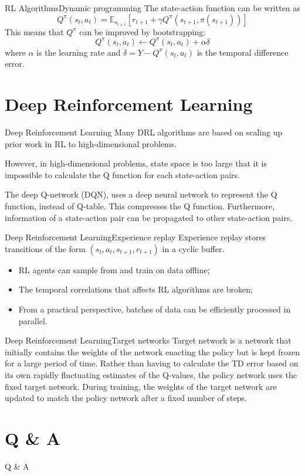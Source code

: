\documentclass{beamer}
\begin{document}
  \begin{frame}{RL Algorithms}{Dynamic programming}
  The state-action function can be written as
  $$ Q^{\pi}(s_t, a_t) = \mathbb{E}_{s_{t+1}}[r_{t+1}+\gamma Q^{\pi}(s_{t+1}, \pi(s_{t+1}))] $$
  This means that $Q^{\pi}$ can be improved by bootstrapping:
  $$ Q^{\pi}(s_t, a_t) \leftarrow Q^{\pi}(s_t, a_t)+ \alpha \delta $$
  where $\alpha$ is the learning rate and $\delta = Y - Q^{\pi}(s_t, a_t)$ is the temporal difference error. 
  \end{frame}

  \section{Deep Reinforcement Learning}
  \begin{frame}{Deep Reinforcement Learning}
    Many DRL algorithms are based on scaling up prior work in RL to high-dimensional problems. \par
    \pause
    However, in high-dimensional problems, state space is too large that it is impossible to calculate the Q function for each state-action pairs. \par
    \pause
    The deep Q-network (DQN), uses a deep neural network to represent the Q function, instead of Q-table. This compresses the Q function. Furthermore, information of a state-action pair can be propagated to other state-action pairs.
  \end{frame}

  \begin{frame}{Deep Reinforcement Learning}{Experience replay}
    Experience replay stores transitions of the form $(s_t, a_t, s_{t+1}, r_{t+1})$ in a cyclic buffer.
    \begin{itemize}
      \item RL agents can sample from and train on data offline;
      \item The temporal correlations that affects RL algorithms are broken;
      \item From a practical perspective, batches of data can be efficiently processed in parallel.
    \end{itemize}
  \end{frame}
  
  \begin{frame}{Deep Reinforcement Learning}{Target networks}
    Target network is a network that initially contains the weights of the network enacting the policy but is kept frozen for a large period of time. Rather than having to calculate the TD error based on its own rapidly fluctuating estimates of the Q-values, the policy network uses the fixed target network. During training, the weights of the target network are updated to match the policy network after a fixed number of steps.
  \end{frame}
  
  \section{Q \& A}
  \begin{frame}{Q \& A}

  \end{frame}
\end{document}
